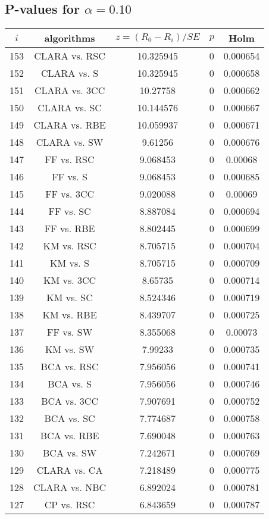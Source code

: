 \documentclass[a4paper,10pt]{article}
\begin{document}
\begin{landscape}
\pagebreak

\subsection{P-values for $\alpha=0.10$}

\begin{table}[!htp]
\centering\scriptsize
\begin{tabular}{ccccc}
$i$&algorithms&$z=(R_0 - R_i)/SE$&$p$&Holm\\
\hline153&CLARA vs. RSC&10.325945&0&0.000654\\
152&CLARA vs. S&10.325945&0&0.000658\\
151&CLARA vs. 3CC&10.27758&0&0.000662\\
150&CLARA vs. SC&10.144576&0&0.000667\\
149&CLARA vs. RBE&10.059937&0&0.000671\\
148&CLARA vs. SW&9.61256&0&0.000676\\
147&FF vs. RSC&9.068453&0&0.00068\\
146&FF vs. S&9.068453&0&0.000685\\
145&FF vs. 3CC&9.020088&0&0.00069\\
144&FF vs. SC&8.887084&0&0.000694\\
143&FF vs. RBE&8.802445&0&0.000699\\
142&KM vs. RSC&8.705715&0&0.000704\\
141&KM vs. S&8.705715&0&0.000709\\
140&KM vs. 3CC&8.65735&0&0.000714\\
139&KM vs. SC&8.524346&0&0.000719\\
138&KM vs. RBE&8.439707&0&0.000725\\
137&FF vs. SW&8.355068&0&0.00073\\
136&KM vs. SW&7.99233&0&0.000735\\
135&BCA vs. RSC&7.956056&0&0.000741\\
134&BCA vs. S&7.956056&0&0.000746\\
133&BCA vs. 3CC&7.907691&0&0.000752\\
132&BCA vs. SC&7.774687&0&0.000758\\
131&BCA vs. RBE&7.690048&0&0.000763\\
130&BCA vs. SW&7.242671&0&0.000769\\
129&CLARA vs. CA&7.218489&0&0.000775\\
128&CLARA vs. NBC&6.892024&0&0.000781\\
127&CP vs. RSC&6.843659&0&0.000787\\

\end{tabular}
\end{table}
\end{landscape}
\end{document}
